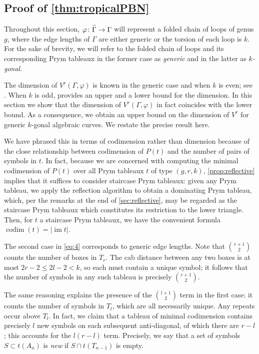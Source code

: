 \documentclass[11pt,reqno]{amsart}
\newcommand*{\abs}[1]{{\lvert #1 \rvert}}
\newcommand*{\maps}{\nobreak\mskip2mu\mathpunct{}\nonscript
  \mkern-\thinmuskip{:}\mskip6muplus1mu\relax}
\newcommand*{\card}[1]{\abs{#1}}
\newcommand*{\wti}[1]{\widetilde{#1}}
\newcommand*{\restrict}[1]{{\mid}_{#1}}
\DeclareMathOperator{\im}{im}
\DeclareMathOperator{\codim}{codim}
\theoremstyle{definition}
\theoremstyle{problem}
\theoremstyle{plain}
\theoremstyle{remark}
\theoremstyle{theorem}
\numberwithin{equation}{section}
\numberwithin{figure}{section}
\begin{document}
\subsection{Proof of
  \cref{thm:tropicalPBN}}\label{sec:tropical-dim-proof}

Throughout this section, $\varphi\maps\wti\Gamma\to\Gamma$ will
represent a folded chain of loops of genus $g$, where the edge lengths
of $\Gamma$ are either generic or the torsion of each loop is $k$. For
the sake of brevity, we will refer to the folded chain of loops and
its corresponding Prym tableaux in the former case as \emph{generic}
and in the latter as \textit{$k$-gonal}.

The dimension of $V^r(\Gamma,\varphi)$ is known in the generic case
and when $k$ is even; see \cite[Theorem~6.1.4, Corollary~6.2.2]{len2019skeletons}.  When
$k$ is odd, \cite[Remark~6.2.3]{len2019skeletons} provides an upper
and a lower bound for the dimension. In this section we show that the
dimension of $V^r(\Gamma, \varphi)$ in fact coincides with the lower
bound. As a consequence, we obtain an upper bound on the dimension of
$V^r$ for generic $k$-gonal algebraic curves.  We restate the precise
result here.

\tropicalPBN*

We have phrased this in terms of codimension rather than dimension
because of the close relationship between codimension of $P(t)$ and
the number of pairs of symbols in $t$.  In fact, because we are
concerned with computing the minimal codimension of $P(t)$ over all
Prym tableaux $t$ of type $(g,r,k)$, \cref{prop:reflective} implies
that it suffices to consider staircase Prym tableaux: given any Prym
tableau, we apply the reflection algorithm to obtain a dominating Prym
tableau, which, per the remarks at the end of \cref{sec:reflective},
may be regarded as the staircase Prym tableaux which constitutes its
restriction to the lower triangle.  Then, for $t$ a staircase Prym
tableaux, we have the convenient formula $\codim(t) = \card{\im t}$.

The second case in \cref{eq:4} corresponds to generic edge lengths.
Note that $\binom{r+1}{2}$ counts the number of boxes in $T_r$.  The
cab distance between any two boxes is at most $2r-2 \leq 2l - 2 < k$,
so each must contain a unique symbol; it follows that the number of
symbols in any such tableau is precisely $\binom{r+1}{2}$.

The same reasoning explains the presence of the $\binom{l+1}{2}$ term
in the first case: it counts the number of symbols in $T_l$, which are
all necessarily unique.  Any repeats occur above $T_l$.  In fact, we
claim that a tableau of minimal codimension contains precisely $l$ new
symbols on each subsequent anti-diagonal, of which there are $r-l$;
this accounts for the $l(r-l)$ term.  Precisely, we say that a set of
symbols $S \subset t(A_n)$ is \textit{new} if $S \cap t(T_{n-1})$ is
empty.
\end{document}
